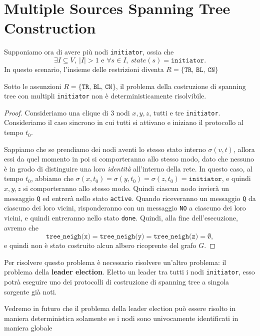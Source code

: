 \newpage

\section{Multiple Sources Spanning Tree Construction}

Supponiamo ora di avere più nodi \texttt{initiator}, ossia che 
\[
    \exists I \subseteq V,\ |I| > 1 \text{ e } \forall s \in I,\ state(s) = \texttt{initiator}.
\]
In questo scenario, l'insieme delle restrizioni diventa $R = \{\texttt{TR, BL, CN}\}$

\begin{teorema}\label{th:MultipleSourcesST}
    Sotto le assunzioni $R = \{\texttt{TR, BL, CN}\}$, il problema della costruzione di spanning tree con multipli \texttt{initiator} non è deterministicamente risolvibile.
    \begin{proof}
    Consideriamo una clique di 3 nodi $x, y, z$, tutti e tre \texttt{initiator}. Consideriamo il caso sincrono in cui tutti si attivano e iniziano il protocollo al tempo $t_0$.

    \begin{center}
    \end{center}
    Sappiamo che se prendiamo dei nodi aventi lo stesso stato interno $\sigma(v, t)$, allora essi da quel momento in poi si comporteranno allo stesso modo, dato che nessuno è in grado di distinguire una loro \textit{identità} all'interno della rete. In questo caso, al tempo $t_0$, abbiamo che $\sigma(x, t_0) = \sigma(y, t_0) = \sigma(z, t_0) = \texttt{initiator}$, e quindi $x, y, z$ si comporteranno allo stesso modo. Quindi ciascun nodo invierà un messaggio \texttt{Q} ed entrerà nello stato \texttt{active}. Quando  riceveranno un messaggio \texttt{Q} da ciascuno dei loro vicini, risponderanno con un messaggio \texttt{NO} a ciascuno dei loro vicini, e quindi entreranno nello stato \texttt{done}. Quindi, alla fine dell'esecuzione, avremo che 
    \[
        \texttt{tree\_neigh(x)} = \texttt{tree\_neigh(y)} = \texttt{tree\_neigh(z)} = \emptyset,
    \]
    e quindi non è stato costruito alcun albero ricoprente del grafo $G$.
    \end{proof}
\end{teorema}

Per risolvere questo problema è necessario risolvere un'altro problema: il problema della \textbf{leader election}. Eletto un leader tra tutti i nodi \texttt{initiator}, esso potrà eseguire uno dei protocolli di costruzione di spanning tree a singola sorgente già noti.

Vedremo in futuro che il problema della leader election può essere risolto in maniera deterministica solamente se i nodi sono univocamente identificati in maniera globale